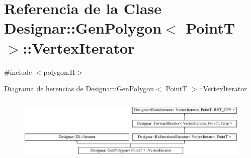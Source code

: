 \hypertarget{class_designar_1_1_gen_polygon_1_1_vertex_iterator}{}\section{Referencia de la Clase Designar\+:\+:Gen\+Polygon$<$ PointT $>$\+:\+:Vertex\+Iterator}
\label{class_designar_1_1_gen_polygon_1_1_vertex_iterator}


{\ttfamily \#include $<$polygon.\+H$>$}

Diagrama de herencias de Designar\+:\+:Gen\+Polygon$<$ PointT $>$\+:\+:Vertex\+Iterator\begin{figure}[H]
\begin{center}
\leavevmode
\includegraphics[height=3.128492cm]{class_designar_1_1_gen_polygon_1_1_vertex_iterator}
\end{center}
\end{figure}
